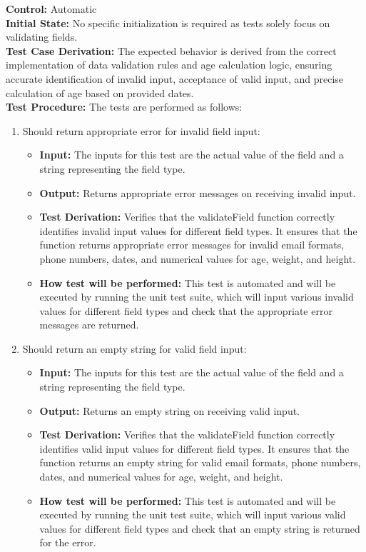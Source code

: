 \documentclass[12pt, titlepage]{article}
\begin{document}
\textbf{Control:} Automatic\\ 
\textbf{Initial State:} No specific initialization is required as tests solely focus on validating fields.\\ 
\textbf{Test Case Derivation:} The expected behavior is derived from the correct implementation of data validation rules and age calculation logic, ensuring accurate identification of invalid input, acceptance of valid input, and precise calculation of age based on provided dates.\\ 
\textbf{Test Procedure:} The tests are performed as follows:\\
\begin{enumerate}
  \item Should return appropriate error for invalid field input:
    \begin{itemize}
      \item \textbf{Input:} The inputs for this test are the actual value of the field and a string representing the field type.   
      \item \textbf{Output:} Returns appropriate error messages on receiving invalid input.
      \item \textbf{Test Derivation:} Verifies that the validateField function correctly identifies invalid input values for different field types. It ensures that the function returns appropriate error messages for invalid email formats, phone numbers, dates, and numerical values for age, weight, and height.
      \item \textbf{How test will be performed:} This test is automated and will be executed by running the unit test suite, which will input various invalid values for different field types and check that the appropriate error messages are returned.
    \end{itemize}

  \item Should return an empty string for valid field input:
    \begin{itemize}
      \item \textbf{Input:} The inputs for this test are the actual value of the field and a string representing the field type.   
      \item \textbf{Output:} Returns an empty string on receiving valid input.
      \item \textbf{Test Derivation:} Verifies that the validateField function correctly identifies valid input values for different field types. It ensures that the function returns an empty string for valid email formats, phone numbers, dates, and numerical values for age, weight, and height.
      \item \textbf{How test will be performed:} This test is automated and will be executed by running the unit test suite, which will input various valid values for different field types and check that an empty string is returned for the error.
    \end{itemize}


\end{enumerate}
\end{document}

